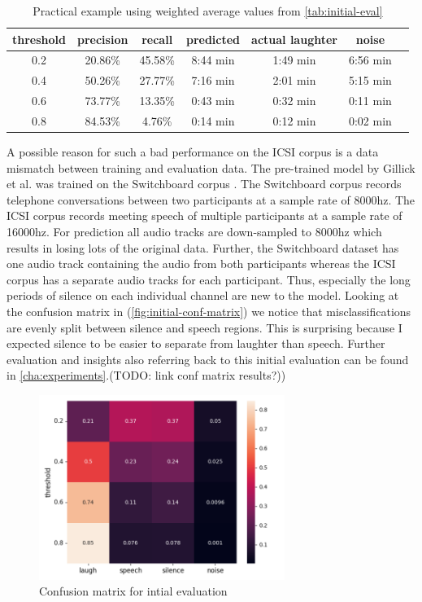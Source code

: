 \documentclass[bsc,frontabs,parskip,deptreport]{infthesis}
\begin{document}
\begin{table}[]
    \centering
    \begin{tabular}{|c|c|c|c|c|c|c|}
      \hline
      threshold & precision & recall & predicted & actual laughter & noise \\
      \hline
      0.2 &  20.86\% & 45.58\% & 8:44 min & 1:49 min & 6:56 min \\
      0.4 &  50.26\% & 27.77\% & 7:16 min & 2:01 min & 5:15 min \\
      0.6 &  73.77\% & 13.35\% & 0:43 min & 0:32 min & 0:11 min \\
      0.8 &  84.53\% & 4.76\% & 0:14 min & 0:12 min & 0:02 min \\
      \hline
    \end{tabular}
    \caption{Practical example using weighted average values from \autoref{tab:initial-eval}}
    \label{tab:practical-example}
\end{table}

A possible reason for such a bad performance on the ICSI corpus is a data mismatch between training and evaluation data. The pre-trained model by Gillick et al. \citep{gillick2021robust} was trained on the Switchboard corpus \citep{switchboard-corpus}. The Switchboard corpus records telephone conversations between two participants at a sample rate of 8000hz. The ICSI corpus records meeting speech of multiple participants at a sample rate of 16000hz. For prediction all audio tracks are down-sampled to 8000hz which results in losing lots of the original data. 
Further, the Switchboard dataset has one audio track containing the audio from both participants whereas the ICSI corpus has a separate audio tracks for each participant. Thus, especially the long periods of silence on each individual channel are new to the model. 
Looking at the confusion matrix in (\autoref{fig:initial-conf-matrix}) we notice that misclassifications are evenly split between silence and speech regions. This is surprising because I expected silence to be easier to separate from laughter than speech.
Further evaluation and insights also referring back to this initial evaluation can be found in \autoref{cha:experiments}.(TODO: link conf matrix results?))

\begin{figure}
    \centering
    \includegraphics[width=8cm]{imgs/conf_matrix/init_eval_train.png}
    \caption{Confusion matrix for intial evaluation}
    \label{fig:initial-conf-matrix}
\end{figure}
\end{document}

